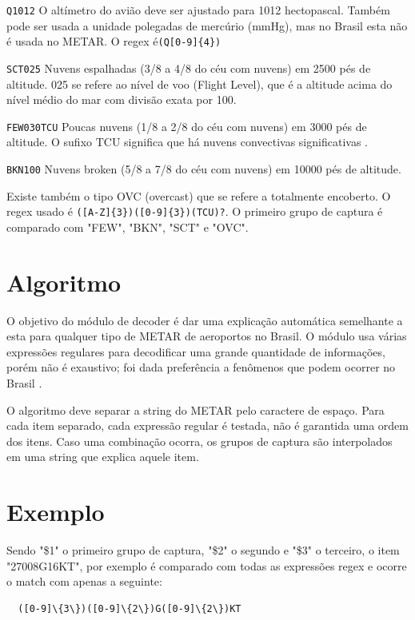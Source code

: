 \texttt{Q1012} O altímetro do avião deve ser ajustado para 1012 hectopascal. 
Também pode ser usada a unidade polegadas de mercúrio (mmHg), mas no Brasil esta 
não é usada no METAR. O regex é\verb|(Q[0-9]{4})|

\texttt{SCT025} Nuvens espalhadas (3/8 a 4/8 do céu com nuvens) em 2500 pés de 
altitude. 025 se refere ao nível de voo (Flight Level), que é a altitude acima 
do nível médio do mar com divisão exata por 100.

\texttt{FEW030TCU} Poucas nuvens (1/8 a 2/8 do céu com nuvens) em 3000 pés de 
altitude. O sufixo TCU significa que há nuvens convectivas significativas \cite{decea-mil}.

\texttt{BKN100} Nuvens broken (5/8 a 7/8 do céu com nuvens) em 10000 pés de altitude.

Existe também o tipo OVC (overcast) que se refere a totalmente encoberto. O regex 
usado é \verb|([A-Z]{3})([0-9]{3})(TCU)?|. O primeiro grupo de captura é comparado 
com "FEW", "BKN", "SCT" e "OVC".

\section{Algoritmo}

O objetivo do módulo de decoder é dar uma explicação automática semelhante a esta 
para qualquer tipo de METAR de aeroportos no Brasil. O módulo usa várias expressões 
regulares para decodificar uma grande quantidade de informações, porém não é exaustivo; 
foi dada preferência a fenômenos que podem ocorrer no Brasil \cite{decea-mil}.

O algoritmo deve separar a string do METAR pelo caractere de espaço. Para cada 
item separado, cada expressão regular é testada, não é garantida uma ordem dos itens.
 Caso uma combinação ocorra, os grupos de captura são interpolados em uma string 
 que explica aquele item. 

\section{Exemplo}

Sendo "\$1" o primeiro grupo de captura, "\$2" o segundo e "\$3" o terceiro, o item "27008G16KT", 
por exemplo é comparado com todas as expressões regex e ocorre o match com apenas a seguinte:

\begin{verbatim}
  ([0-9]\{3\})([0-9]\{2\})G([0-9]\{2\})KT
\end{verbatim}

